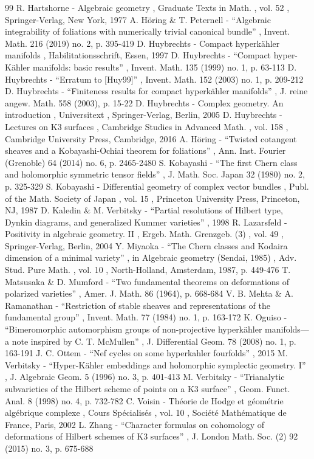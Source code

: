 \documentclass[11pt]{article}
\theoremstyle{plain}
\theoremstyle{definition}
\begin{document}
\begin{thebibliography}{99}
 R. Hartshorne - Algebraic geometry , Graduate Texts in Math. , vol. 52 , Springer-Verlag, New York, 1977
 A. Höring \& T. Peternell - “Algebraic integrability of foliations with numerically trivial canonical bundle” , Invent. Math. 216 (2019) no. 2, p. 395-419
 D. Huybrechts - Compact hyperkähler manifolds , Habilitationsschrift, Essen, 1997
 D. Huybrechts - “Compact hyper-Kähler manifolds: basic results” , Invent. Math. 135 (1999) no. 1, p. 63-113
 D. Huybrechts - “Erratum to [Huy99]” , Invent. Math. 152 (2003) no. 1, p. 209-212
 D. Huybrechts - “Finiteness results for compact hyperkähler manifolds” , J. reine angew. Math. 558 (2003), p. 15-22
 D. Huybrechts - Complex geometry. An introduction , Universitext , Springer-Verlag, Berlin, 2005
 D. Huybrechts - Lectures on K3 surfaces , Cambridge Studies in Advanced Math. , vol. 158 , Cambridge University Press, Cambridge, 2016
 A. Höring - “Twisted cotangent sheaves and a Kobayashi-Ochiai theorem for foliations” , Ann. Inst. Fourier (Grenoble) 64 (2014) no. 6, p. 2465-2480
 S. Kobayashi - “The first Chern class and holomorphic symmetric tensor fields” , J. Math. Soc. Japan 32 (1980) no. 2, p. 325-329
 S. Kobayashi - Differential geometry of complex vector bundles , Publ. of the Math. Society of Japan , vol. 15 , Princeton University Press, Princeton, NJ, 1987
 D. Kaledin \& M. Verbitsky - “Partial resolutions of Hilbert type, Dynkin diagrams, and generalized Kummer varieties” , 1998
 R. Lazarsfeld - Positivity in algebraic geometry. II , Ergeb. Math. Grenzgeb. (3) , vol. 49 , Springer-Verlag, Berlin, 2004
 Y. Miyaoka - “The Chern classes and Kodaira dimension of a minimal variety” , in Algebraic geometry (Sendai, 1985) , Adv. Stud. Pure Math. , vol. 10 , North-Holland, Amsterdam, 1987, p. 449-476
 T. Matsusaka \& D. Mumford - “Two fundamental theorems on deformations of polarized varieties” , Amer. J. Math. 86 (1964), p. 668-684
 V. B. Mehta \& A. Ramanathan - “Restriction of stable sheaves and representations of the fundamental group” , Invent. Math. 77 (1984) no. 1, p. 163-172
 K. Oguiso - “Bimeromorphic automorphism groups of non-projective hyperkähler manifolds—a note inspired by C. T. McMullen” , J. Differential Geom. 78 (2008) no. 1, p. 163-191
 J. C. Ottem - “Nef cycles on some hyperkahler fourfolds” , 2015
 M. Verbitsky - “Hyper-Kähler embeddings and holomorphic symplectic geometry. I” , J. Algebraic Geom. 5 (1996) no. 3, p. 401-413
 M. Verbitsky - “Trianalytic subvarieties of the Hilbert scheme of points on a K3 surface” , Geom. Funct. Anal. 8 (1998) no. 4, p. 732-782
 C. Voisin - Théorie de Hodge et géométrie algébrique complexe , Cours Spécialisés , vol. 10 , Société Mathématique de France, Paris, 2002
 L. Zhang - “Character formulas on cohomology of deformations of Hilbert schemes of K3 surfaces” , J. London Math. Soc. (2) 92 (2015) no. 3, p. 675-688
\end{thebibliography}
\end{document}
